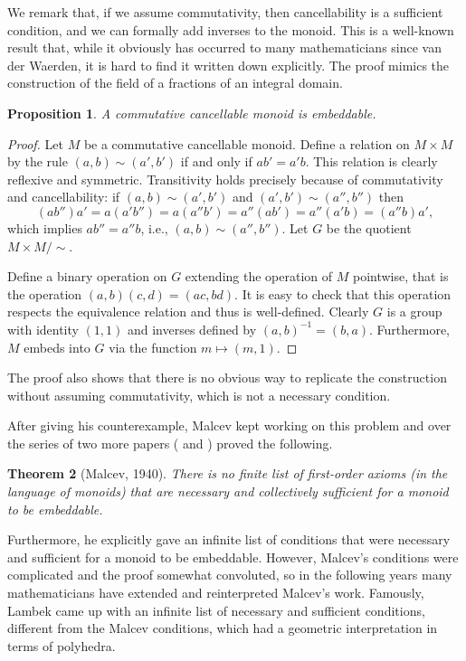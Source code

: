 \documentclass{article}
\theoremstyle{plain}
\newtheorem{thm}{Theorem}[section]
\newtheorem{prop}[thm]{Proposition}
\theoremstyle{definition}
\begin{document}
	We remark that, if we assume commutativity, then cancellability is a sufficient condition, and we can formally add inverses to the monoid. This is a well-known result that, while it obviously has occurred to many mathematicians since van der Waerden, it is hard to find it written down explicitly. The proof mimics the construction of the field of a fractions of an integral domain.
	\begin{prop}
		A commutative cancellable monoid is embeddable.
	\end{prop}
	\begin{proof}
		Let $M$ be a commutative cancellable monoid. Define a relation on $M\times M$ by the rule $(a,b)\sim (a',b')$ if and only if $ab' = a'b$. This relation is clearly reflexive and symmetric. Transitivity holds precisely because of commutativity and cancellability: if $(a,b)\sim (a',b')$ and $(a',b')\sim (a'',b'')$ then
		\begin{equation*}
			(ab'')a' = a(a'b'')
			= a(a''b')
			= a''(ab')
			= a''(a'b)
			= (a''b)a',
		\end{equation*}
		which implies $ab'' = a''b$, i.e., $(a,b)\sim (a'',b'')$. Let $G$ be the quotient $M\times M / \sim$. 
		
		Define a binary operation on $G$ extending the operation of $M$ pointwise, that is the operation $(a,b)(c,d) = (ac,bd)$. It is easy to check that this operation respects the equivalence relation and thus is well-defined. Clearly $G$ is a group with identity $(1,1)$ and inverses defined by $(a,b)^{-1} = (b,a)$. Furthermore, $M$ embeds into $G$ via the function $m\mapsto (m,1)$.
	\end{proof}
	The proof also shows that there is no obvious way to replicate the construction without assuming commutativity, which is not a necessary condition.  
	
	After giving his counterexample, Malcev kept working on this problem and over the series of two more papers (\cite{malcev1939immersionI} and \cite{malcev1940immersionII}) proved the following.
	\begin{thm}[Malcev, 1940]
		There is no finite list of first-order axioms (in the language of monoids) that are necessary and collectively sufficient for a monoid to be embeddable.
	\end{thm}
	Furthermore, he explicitly gave an infinite list of conditions that were necessary and sufficient for a monoid to be embeddable. However, Malcev's conditions were complicated and the proof somewhat convoluted, so in the following years many mathematicians have extended and reinterpreted Malcev's work. Famously, Lambek \cite{lambek1951immersibility} came up with an infinite list of necessary and sufficient conditions, different from the Malcev conditions, which had a geometric interpretation in terms of polyhedra. 
	
\end{document}
